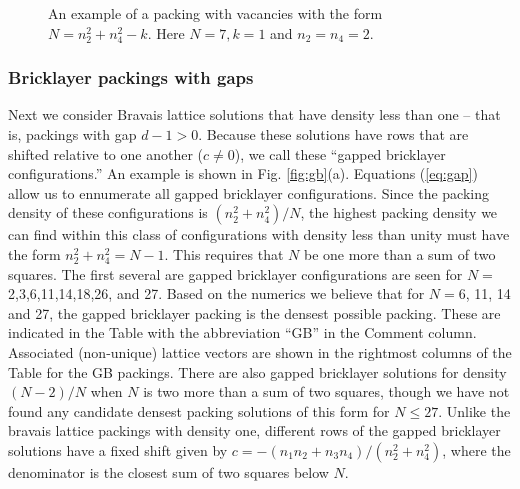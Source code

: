 \documentclass[aps]{revtex4}
\begin{document}
\begin{figure}[H]
\caption{\label{fig:n7} An example of a packing with vacancies with the form $N=n_2^2 + n_4^2-k$. Here $N=7, k=1$ and $n_2=n_4=2$.}
\end{figure}

\subsubsection{Bricklayer packings with gaps}
\label{sec:bricklayer}
Next we consider Bravais lattice solutions that have density less than one -- that is, packings with gap $d-1 > 0$.  Because these solutions have rows that are shifted relative to one another ($c\neq 0$), we call these ``gapped bricklayer configurations.''  An example is shown in Fig. \ref{fig:gb}(a).  Equations (\ref{eq:gap}) allow us to ennumerate all gapped bricklayer configurations. Since the packing density of these configurations is $(n_2^2 + n_4^2)/N$, the highest packing density we can find within this class of configurations with density less than unity must have the form $n_2^2 + n_4^2 = N-1$.  This requires that $N$ be one more than a sum of two squares. The first several are gapped bricklayer configurations are seen for $N=$ 2,3,6,11,14,18,26, and 27.  Based on the numerics we believe that for $N=6$, 11, 14 and 27, the gapped bricklayer packing is the densest possible packing. These are indicated in the Table with the abbreviation ``GB'' in the Comment column. Associated (non-unique) lattice vectors are shown in the rightmost columns of the Table for the GB packings.  There are also gapped bricklayer solutions for density $(N-2)/N$ when $N$ is two more than a sum of two squares, though we have not found any candidate densest packing solutions of this form for $N \leq 27$. Unlike the bravais lattice packings with density one, different rows of the gapped bricklayer solutions have a fixed shift given by $c = - (n_1 n_2 + n_3 n_4)/(n_2^2 + n_4^2)$, where the denominator is the closest sum of two squares below $N$. 
\end{document}

